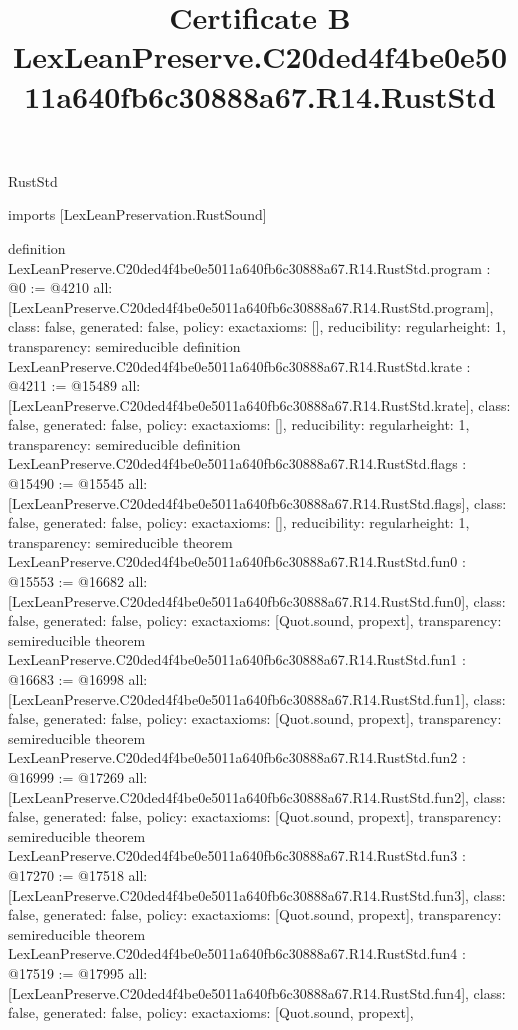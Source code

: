 \begin{lexlean}{RustStd}
\title{Certificate B LexLeanPreserve.C20ded4f4be0e5011a640fb6c30888a67.R14.RustStd}
\begin{coremodule}
imports [LexLeanPreservation.RustSound]

definition LexLeanPreserve.C20ded4f4be0e5011a640fb6c30888a67.R14.RustStd.program : @0 := @4210 {
  all: [LexLeanPreserve.C20ded4f4be0e5011a640fb6c30888a67.R14.RustStd.program],
  class: false,
  generated: false,
  policy: exact{axioms: []},
  reducibility: regular{height: 1},
  transparency: semireducible
}
definition LexLeanPreserve.C20ded4f4be0e5011a640fb6c30888a67.R14.RustStd.krate : @4211 := @15489 {
  all: [LexLeanPreserve.C20ded4f4be0e5011a640fb6c30888a67.R14.RustStd.krate],
  class: false,
  generated: false,
  policy: exact{axioms: []},
  reducibility: regular{height: 1},
  transparency: semireducible
}
definition LexLeanPreserve.C20ded4f4be0e5011a640fb6c30888a67.R14.RustStd.flags : @15490 := @15545 {
  all: [LexLeanPreserve.C20ded4f4be0e5011a640fb6c30888a67.R14.RustStd.flags],
  class: false,
  generated: false,
  policy: exact{axioms: []},
  reducibility: regular{height: 1},
  transparency: semireducible
}
theorem LexLeanPreserve.C20ded4f4be0e5011a640fb6c30888a67.R14.RustStd.fun0 : @15553 := @16682 {
  all: [LexLeanPreserve.C20ded4f4be0e5011a640fb6c30888a67.R14.RustStd.fun0],
  class: false,
  generated: false,
  policy: exact{axioms: [Quot.sound, propext]},
  transparency: semireducible
}
theorem LexLeanPreserve.C20ded4f4be0e5011a640fb6c30888a67.R14.RustStd.fun1 : @16683 := @16998 {
  all: [LexLeanPreserve.C20ded4f4be0e5011a640fb6c30888a67.R14.RustStd.fun1],
  class: false,
  generated: false,
  policy: exact{axioms: [Quot.sound, propext]},
  transparency: semireducible
}
theorem LexLeanPreserve.C20ded4f4be0e5011a640fb6c30888a67.R14.RustStd.fun2 : @16999 := @17269 {
  all: [LexLeanPreserve.C20ded4f4be0e5011a640fb6c30888a67.R14.RustStd.fun2],
  class: false,
  generated: false,
  policy: exact{axioms: [Quot.sound, propext]},
  transparency: semireducible
}
theorem LexLeanPreserve.C20ded4f4be0e5011a640fb6c30888a67.R14.RustStd.fun3 : @17270 := @17518 {
  all: [LexLeanPreserve.C20ded4f4be0e5011a640fb6c30888a67.R14.RustStd.fun3],
  class: false,
  generated: false,
  policy: exact{axioms: [Quot.sound, propext]},
  transparency: semireducible
}
theorem LexLeanPreserve.C20ded4f4be0e5011a640fb6c30888a67.R14.RustStd.fun4 : @17519 := @17995 {
  all: [LexLeanPreserve.C20ded4f4be0e5011a640fb6c30888a67.R14.RustStd.fun4],
  class: false,
  generated: false,
  policy: exact{axioms: [Quot.sound, propext]},
}
\end{coremodule}
\end{lexlean}
